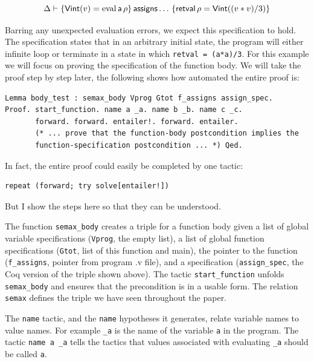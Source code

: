 \documentclass{puthesis}
\begin{document}
\[\Delta \vdash \{\mathsf{Vint}(v)=\mathrm{eval}\,\mathsf{a}\,\rho\}\,\mathsf{assigns}\ldots\,\{\mathsf{retval}\,\rho = \mathsf{Vint}((v * v) /
3)\}\]

Barring any unexpected evaluation errors, we expect this specification to hold.
The specification states that in an arbitrary initial state, the program will either
infinite loop or terminate in a state in which \lstinline|retval = (a*a)/3|. For this
example we will focus on proving the specification of the function
body. We will take the proof step by step later, the following shows
how automated the entire proof is:

\pagebreak

\begin{lstlisting}
Lemma body_test : semax_body Vprog Gtot f_assigns assign_spec.
Proof. start_function. name a _a. name b _b. name c _c.
       forward. forward. entailer!. forward. entailer. 
       (* ... prove that the function-body postcondition implies the
       function-specification postcondition ... *) Qed.
\end{lstlisting}

In fact, the entire proof could easily be completed by one tactic:

\begin{lstlisting}
repeat (forward; try solve[entailer!])
\end{lstlisting}

But I show the steps here so that they can be understood.

The function \lstinline|semax_body| creates a triple for a function body given a
list of global variable specifications (\lstinline|Vprog|, the empty list), a
list of global function specifications (\lstinline|Gtot|, list of this function and
main), the pointer to the function (\lstinline|f_assigns|, pointer from
program .v file), and a specification (\lstinline|assign_spec|, the Coq version
of the triple shown above). The tactic \lstinline|start_function| unfolds
\lstinline|semax_body| and ensures that the precondition is in a usable form.
The relation \lstinline|semax| defines the triple we have seen throughout the
paper.

The \lstinline|name| tactic, and
the \lstinline|name| hypotheses it generates, relate variable names to value
names. For example \lstinline|_a| is the name of the variable \lstinline|a| in
the program. The tactic \lstinline|name a _a| tells the tactics that values
associated with evaluating \lstinline|_a| should be called \lstinline|a|.
\end{document}
